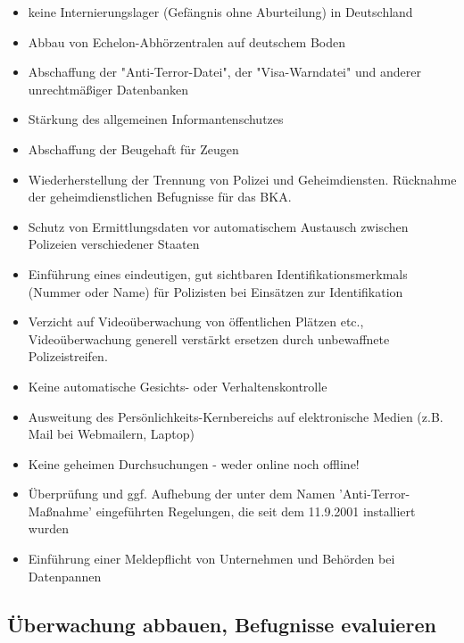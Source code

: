 \begin{itemize}
\item keine Internierungslager (Gefängnis ohne Aburteilung) in Deutschland
\item Abbau von Echelon-Abhörzentralen auf deutschem Boden
\item Abschaffung der "Anti-Terror-Datei", der "Visa-Warndatei" und anderer unrechtmäßiger Datenbanken
\item Stärkung des allgemeinen Informantenschutzes
\item Abschaffung der Beugehaft für Zeugen
\item Wiederherstellung der Trennung von Polizei und Geheimdiensten. Rücknahme der geheimdienstlichen Befugnisse für das BKA.
\item Schutz von Ermittlungsdaten vor automatischem Austausch zwischen Polizeien verschiedener Staaten
\item Einführung eines eindeutigen, gut sichtbaren Identifikationsmerkmals (Nummer oder Name) für Polizisten bei Einsätzen zur Identifikation
\item Verzicht auf Videoüberwachung von öffentlichen Plätzen etc., Videoüberwachung generell verstärkt ersetzen durch unbewaffnete Polizeistreifen.
\item Keine automatische Gesichts- oder Verhaltenskontrolle
\item Ausweitung des Persönlichkeits-Kernbereichs auf elektronische Medien (z.B. Mail bei Webmailern, Laptop)
\item Keine geheimen Durchsuchungen - weder online noch offline!
\item Überprüfung und ggf. Aufhebung der unter dem Namen 'Anti-Terror-Maßnahme' eingeführten Regelungen, die seit dem 11.9.2001 installiert wurden
\item Einführung einer Meldepflicht von Unternehmen und Behörden bei Datenpannen
\end{itemize}

\subsection*{Überwachung abbauen, Befugnisse evaluieren}
\label{datenschutz:ueberwachung}
